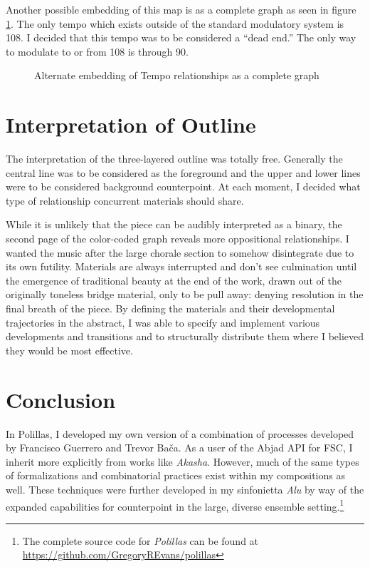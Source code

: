 Another possible embedding of this map is as a complete graph as seen in figure \ref{fig:polillas-tempo-2}. The only tempo which exists outside of the standard modulatory system is 108. I decided that this tempo was to be considered a ``dead end.'' The only way to modulate to or from 108 is through 90.

\begin{figure}
    \centering
{}
    \caption{Alternate embedding of Tempo relationships as a complete graph}
    \label{fig:polillas-tempo-2}
\end{figure}

\section{Interpretation of Outline}

The interpretation of the three-layered outline was totally free. Generally the central line was to be considered as the foreground and the upper and lower lines were to be considered background counterpoint. At each moment, I decided what type of relationship concurrent materials should share.

While it is unlikely that the piece can be audibly interpreted as a binary, the second page of the color-coded graph reveals more oppositional relationships. I wanted the music after the large chorale section to somehow disintegrate due to its own futility. Materials are always interrupted and don't see culmination until the emergence of traditional beauty at the end of the work, drawn out of the originally toneless bridge material, only to be pull away: denying resolution in the final breath of the piece. By defining the materials and their developmental trajectories in the abstract, I was able to specify and implement various developments and transitions and to structurally distribute them where I believed they would be most effective.

\section{Conclusion}

In Polillas, I developed my own version of a combination of processes developed by Francisco Guerrero and Trevor Bača. As a user of the Abjad \ac{API} for \ac{FSC}, I inherit more explicitly from works like \textit{Akasha}. However, much of the same types of formalizations and combinatorial practices exist within my compositions as well. These techniques were further developed in my sinfonietta \textit{Alu} by way of the expanded capabilities for counterpoint in the large, diverse ensemble setting.\footnote{The complete source code for \textit{Polillas} can be found at \url{https://github.com/GregoryREvans/polillas}} 